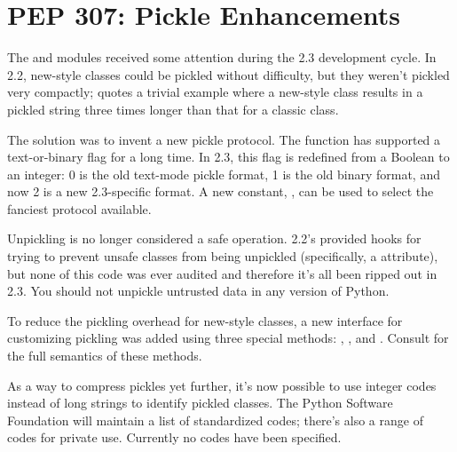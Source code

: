 \documentclass{howto}
\begin{document}
\section{PEP 307: Pickle Enhancements \label{section-pep305}}

The  and  modules received some
attention during the 2.3 development cycle.  In 2.2, new-style classes
could be pickled without difficulty, but they weren't pickled very
compactly;  quotes a trivial example where a new-style class
results in a pickled string three times longer than that for a classic
class.

The solution was to invent a new pickle protocol.  The
 function has supported a text-or-binary flag 
for a long time.  In 2.3, this flag is redefined from a Boolean to an
integer: 0 is the old text-mode pickle format, 1 is the old binary
format, and now 2 is a new 2.3-specific format.  A new constant,
, can be used to select the fanciest
protocol available.

Unpickling is no longer considered a safe operation.  2.2's
 provided hooks for trying to prevent unsafe classes
from being unpickled (specifically, a
 attribute), but none of this code
was ever audited and therefore it's all been ripped out in 2.3.  You
should not unpickle untrusted data in any version of Python.

To reduce the pickling overhead for new-style classes, a new interface
for customizing pickling was added using three special methods:
, , and
.  Consult  for the full semantics 
of these methods.

As a way to compress pickles yet further, it's now possible to use
integer codes instead of long strings to identify pickled classes.
The Python Software Foundation will maintain a list of standardized
codes; there's also a range of codes for private use.  Currently no
codes have been specified.

\begin{seealso}


\end{seealso}

\end{document}
